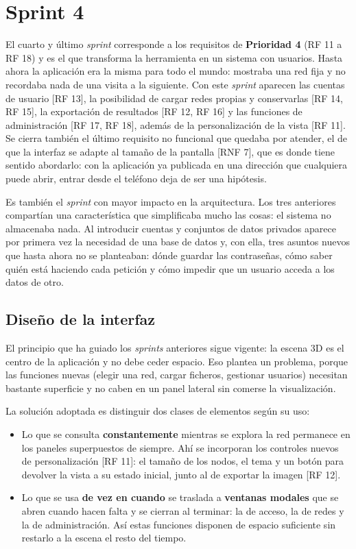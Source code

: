 \section{Sprint 4}

El cuarto y último \textit{sprint} corresponde a los requisitos de \textbf{Prioridad 4} (RF 11 a
RF 18) y es el que transforma la herramienta en un sistema con usuarios. Hasta ahora la aplicación
era la misma para todo el mundo: mostraba una red fija y no recordaba nada de una visita a la
siguiente. Con este \textit{sprint} aparecen las cuentas de usuario [RF 13], la posibilidad de
cargar redes propias y conservarlas [RF 14, RF 15], la exportación de resultados [RF 12, RF 16] y
las funciones de administración [RF 17, RF 18], además de la personalización de la vista [RF 11]. Se
cierra también el último requisito no funcional que quedaba por atender, el de que la interfaz se
adapte al tamaño de la pantalla [RNF 7], que es donde tiene sentido abordarlo: con la aplicación ya
publicada en una dirección que cualquiera puede abrir, entrar desde el teléfono deja de ser una
hipótesis.

Es también el \textit{sprint} con mayor impacto en la arquitectura. Los tres anteriores compartían
una característica que simplificaba mucho las cosas: el sistema no almacenaba nada. Al introducir
cuentas y conjuntos de datos privados aparece por primera vez la necesidad de una base de datos y,
con ella, tres asuntos nuevos que hasta ahora no se planteaban: dónde guardar las contraseñas, cómo
saber quién está haciendo cada petición y cómo impedir que un usuario acceda a los datos de otro.

\subsection{Diseño de la interfaz}

El principio que ha guiado los \textit{sprints} anteriores sigue vigente: la escena 3D es el centro
de la aplicación y no debe ceder espacio. Eso plantea un problema, porque las funciones nuevas
(elegir una red, cargar ficheros, gestionar usuarios) necesitan bastante superficie y no caben en un
panel lateral sin comerse la visualización.

La solución adoptada es distinguir dos clases de elementos según su uso:

\begin{itemize}
	\item Lo que se consulta \textbf{constantemente} mientras se explora la red permanece en los
		paneles superpuestos de siempre. Ahí se incorporan los controles nuevos de personalización
		[RF 11]: el tamaño de los nodos, el tema y un botón para devolver la vista a su estado
		inicial, junto al de exportar la imagen [RF 12].
	\item Lo que se usa \textbf{de vez en cuando} se traslada a \textbf{ventanas modales} que se
		abren cuando hacen falta y se cierran al terminar: la de acceso, la de redes y la de
		administración. Así estas funciones disponen de espacio suficiente sin restarlo a la escena
		el resto del tiempo.
\end{itemize}

